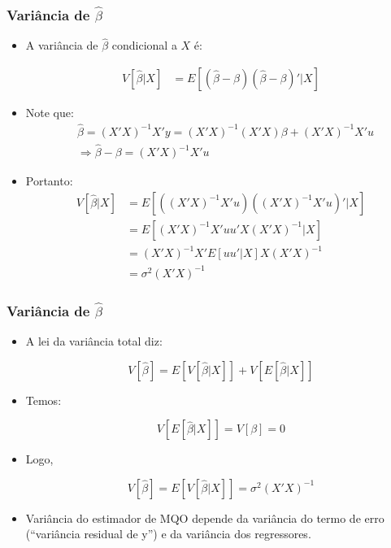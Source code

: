\documentclass[10pt,slides,xcolor=pdftex,dvipsnames,table]{beamer}
\begin{document}
\begin{frame}[fragile]
	\frametitle{Variância de $\widehat{\beta}$}

\begin{itemize}\itemsep1.2em

\item A variância de $\widehat{\beta}$ condicional a $X$ é:

\begin{align*}
V [\widehat{\beta} | X] &= E \left[ (\widehat{\beta} - \beta)(\widehat{\beta} - \beta)'| X \right] 
\end{align*}

\item Note que: 
\begin{align*}
& \widehat{\beta} = (X'X)^{-1} X'y = (X'X)^{-1} (X'X) \beta + (X'X)^{-1} X'u \\
& \Longrightarrow  \widehat{\beta} - \beta = (X'X)^{-1} X'u
\end{align*}

\item Portanto: 
\begin{align*}
V [\widehat{\beta} | X] &= E \left[ ((X'X)^{-1} X'u)((X'X)^{-1} X'u)'| X \right] \\
&= E \left[ (X'X)^{-1} X' uu' X (X'X)^{-1} | X \right] \\
&= (X'X)^{-1} X' E[u u'| X]  X (X'X)^{-1} \\
&= \sigma^2 (X'X)^{-1}
\end{align*}

\end{itemize}

\end{frame}


\begin{frame}[fragile]
	\frametitle{Variância de $\widehat{\beta}$}

\begin{itemize}\itemsep1.2em

\item A lei da variância total diz: 

$$ V [\widehat{\beta} ] = E \left[ V[\widehat{\beta} | X ] \right] + V \left[ E[\widehat{\beta} | X] \right] $$

\item Temos: 

$$V \left[ E[\widehat{\beta} | X] \right] = V [ \beta] = 0$$

\item Logo, 

$$ V [\widehat{\beta} ] = E \left[ V[\widehat{\beta} | X ] \right] = \sigma^2 (X'X)^{-1}$$

\item Variância do estimador de MQO depende da variância do termo de erro (``variância residual de y'') e da variância dos regressores.

\end{itemize}

\end{frame}
\end{document}

